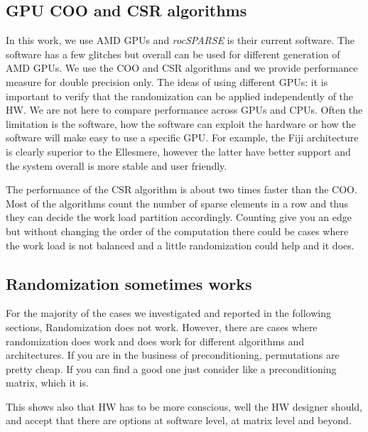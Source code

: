 \documentclass[acmsmall]{acmart}
\begin{document}
\subsection{GPU COO and CSR algorithms}
\label{sec:gpucoocsr}
In this work, we use AMD GPUs and {\em rocSPARSE} is their current
software. The software has a few glitches but overall can be used for
different generation of AMD GPUs. We use the COO and CSR algorithms
and we provide performance measure for double precision only. The
ideas of using different GPUs: it is important to verify that the
randomization can be applied independently of the HW. We are not here
to compare performance across GPUs and CPUs. Often the limitation is
the software, how the software can exploit the hardware or how the
software will make easy to use a specific GPU. For example, the Fiji
architecture is clearly superior to the Ellesmere, however the latter
have better support and the system overall is more stable and user
friendly.

The performance of the CSR algorithm is about two times faster than the
COO. Most of the algorithms count the number of sparse elements in a
row and thus they can decide the work load partition
accordingly. Counting give you an edge but without changing the order
of the computation there could be cases where the work load is not
balanced and a little randomization could help and it does.

\subsection{Randomization sometimes works}

For the majority of the cases we investigated and reported in the
following sections, Randomization does not work. However, there are
cases where randomization does work and does work for different
algorithms and architectures. If you are in the business of
preconditioning, permutations are pretty cheap. If you can find a good
one just consider like a preconditioning matrix, which it is. 

This shows also that HW has to be more conscious, well the HW designer
should, and accept that there are options at software level, at matrix
level and beyond. 


\end{document}
